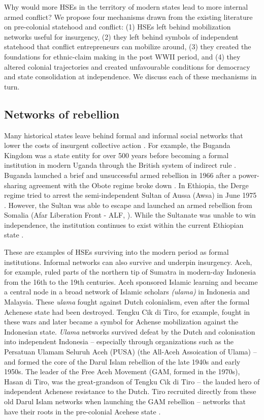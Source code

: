 Why would more HSEs in the territory of modern states lead to more internal
armed conflict? We propose four mechanisms drawn from the existing literature on
pre-colonial statehood and conflict: (1) HSEs left behind mobilization networks
useful for insurgency, (2) they left behind symbols of independent statehood
that conflict entrepreneurs can mobilize around, (3) they created the
foundations for ethnic-claim making in the post WWII period, and (4) they altered
colonial trajectories and created unfavourable conditions for democracy and
state consolidation at independence. We discuss each of these mechanisms in
turn. 

\subsection{Networks of rebellion}

Many historical states leave behind formal and informal \citep{Wig2016} social
networks that lower the costs of insurgent collective action \cite[17]{Wood2000,
Staniland2014}. For example, the Buganda Kingdom was a state entity for over 500
years before becoming a formal institution in modern Uganda through the British
system of indirect rule \citep{Tuck2005}. Buganda launched a brief and
unsuccessful armed rebellion in 1966 after a power-sharing agreement with the
Obote regime broke down \citep{Tuck2005}. In Ethiopia, the Derge regime tried to
arrest the semi-independent Sultan of Aussa (Awsa) in June 1975
\citep{Shehim1985}. However, the Sultan was able to escape and launched an armed
rebellion from Somalia (Afar Liberation Front - ALF, \citet{Shehim1985}).  While
the Sultanate was unable to win independence, the institution continues to exist
within the current Ethiopian state \citep{Hanfare2011}. 

These are examples of HSEs surviving into the modern period as formal
institutions. Informal networks can also survive and underpin insurgency. Aceh,
for example, ruled parts of the northern tip of Sumatra in modern-day Indonesia
from the 16th to the 19th centuries. Aceh sponsored Islamic learning and became
a central node in a broad network of Islamic scholars \textit{(ulama)} in
Indonesia and Malaysia. These \textit{ulama} fought against Dutch colonialism,
even after the formal Achenese state had been destroyed. Tengku Cik di Tiro, for
example, fought in these wars and later became a symbol for Achense mobilization
against the Indonesian state. \textit{Ulama} networks survived defeat by the
Dutch and colonisation into independent Indonesia -- especially through
organizations such as the Persatuan Ulamam Seluruh Aceh (PUSA) (the All-Aceh
Assoication of Ulama)  \citep[28]{Aspinall2009} -- and formed the core of the
Darul Islam rebellion of the late 1940s and early 1950s.  The leader of the Free
Aceh Movement (GAM, formed in the 1970s), Hasan di Tiro, was the great-grandson
of Tengku Cik di Tiro -- the lauded hero of independent Achenese resistance to
the Dutch. Tiro recruited directly from these old Darul Islam networks when
launching the GAM rebellion -- networks that have their roots in the
pre-colonial Acehese state \citep[61-62]{Aspinall2009}. 


